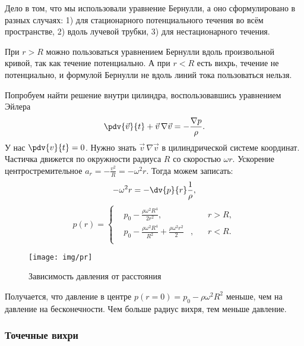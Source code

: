 Дело в том, что мы  использовали уравнение Бернулли, а оно сформулировано в разных случаях: 1) для стационарного потенциального течения во всём пространстве, 2) вдоль лучевой трубки, 3) для нестационарного течения.

При $r>R$ можно пользоваться уравнением Бернулли вдоль произвольной кривой, так как течение потенциально. А при $r<R$ есть вихрь, течение не потенциально, и формулой Бернулли не вдоль линий тока пользоваться нельзя.

Попробуем найти решение внутри цилиндра, воспользовавшись уравнением Эйлера
\begin{equation}
	\pdv{\vec{v}}{t}+\vec{v}\,\nabla\vec{v}=-\frac{\nabla p}{\rho}.
\end{equation}
У нас $\pdv{v}{t}=0$. Нужно знать $\vec{v}\,\nabla\vec{v}$ в цилиндрической системе координат. Частичка движется по окружности радиуса $R$ со  скоростью   $\omega r$. Ускорение центростремительное $a_r=-\frac{v^2}{R}=-\omega^2 r$. Тогда можем записать:
\begin{equation}
	-\omega^2 r  = - \dv{p}{r}\frac{1}{\rho},
\end{equation}
\begin{equation}
	p(r)=\left\{
	\begin{aligned}
		&p_0-\frac{\rho\omega^2 R^4}{2r^2},& \quad& r>R,\\
		&p_0-\frac{\rho\omega^2 R^4}{R^2}+\frac{\rho\omega^2 r^2}{2}&, \quad& r<R.\\
	\end{aligned}
	\right.
\end{equation}
\begin{figure}[H]
    \centering
    \texttt{[image: img/pr]}
    \caption{Зависимость давления от расстояния}
    \label{fig:p_from_r}
\end{figure}
Получается, что давление в центре $p(r=0)=p_0-{\rho\omega^2 R^2}$ меньше, чем на давление на бесконечности. Чем больше радиус вихря, тем меньше давление.




\subsubsection{Точечные вихри}

